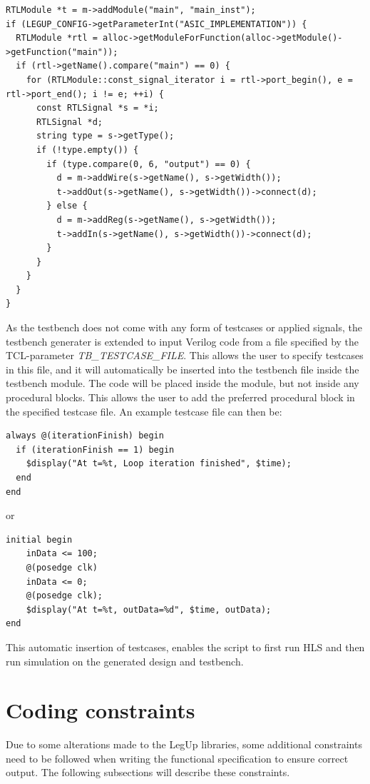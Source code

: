 \begin{lstlisting}
RTLModule *t = m->addModule("main", "main_inst");
if (LEGUP_CONFIG->getParameterInt("ASIC_IMPLEMENTATION")) {
  RTLModule *rtl = alloc->getModuleForFunction(alloc->getModule()->getFunction("main"));
  if (rtl->getName().compare("main") == 0) {
    for (RTLModule::const_signal_iterator i = rtl->port_begin(), e = rtl->port_end(); i != e; ++i) {
      const RTLSignal *s = *i;
      RTLSignal *d;
      string type = s->getType();
      if (!type.empty()) {
        if (type.compare(0, 6, "output") == 0) {
          d = m->addWire(s->getName(), s->getWidth());
          t->addOut(s->getName(), s->getWidth())->connect(d);
        } else {
          d = m->addReg(s->getName(), s->getWidth());
          t->addIn(s->getName(), s->getWidth())->connect(d);
        }
      }
    }
  }
}
\end{lstlisting}

As the testbench does not come with any form of testcases or applied signals, the testbench generater is extended to input Verilog code from a file specified by the TCL-parameter \textit{TB\_TESTCASE\_FILE}. This allows the user to specify testcases in this file, and it will automatically be inserted into the testbench file inside the testbench module. The code will be placed inside the module, but not inside any procedural blocks. This allows the user to add the preferred procedural block in the specified testcase file. An example testcase file can then be:

\lstset{language=Verilog, style=Verilogstyle}
\begin{lstlisting}
always @(iterationFinish) begin
  if (iterationFinish == 1) begin
    $display("At t=%t, Loop iteration finished", $time);
  end
end
\end{lstlisting}
or
\begin{lstlisting}
initial begin
    inData <= 100;
    @(posedge clk)
    inData <= 0;
    @(posedge clk);
    $display("At t=%t, outData=%d", $time, outData);
end
\end{lstlisting}
This automatic insertion of testcases, enables the script to first run HLS and then run simulation on the generated design and testbench.

\section{Coding constraints}
Due to some alterations made to the LegUp libraries, some additional constraints need to be followed when writing the functional specification to ensure correct output. The following subsections will describe these constraints.
